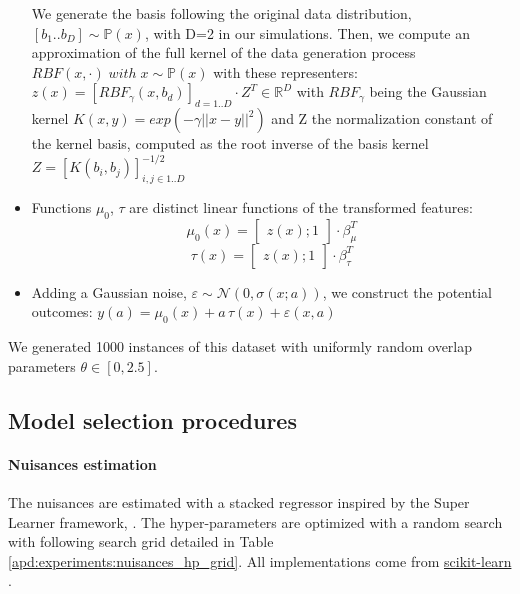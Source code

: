 \documentclass{report}
\begin{document}
\begin{appendices}
\begin{itemize}
          We generate the basis following the original data distribution, $\left [
              b_1 .. b_D \right ] \sim \mathbb P(x)$, with D=2 in our simulations. Then, we
          compute an approximation of the full kernel of the data generation
          process $RBF(x, \cdot) \;  with \; x \sim \mathbb P(x)$ with these
          representers: $z(x) = [RBF_{\gamma}(x, b_d)]_{d=1..D}
            \cdot Z^T \in \mathbb{R}^D$
          with $RBF_{\gamma}$ being the Gaussian kernel $K(x, y) = exp(-\gamma
            ||x-y||^2)$ and Z the normalization constant of the kernel basis,
          computed as the root inverse of the basis kernel $Z=[K(b_i, b_j)]_{i, j
            \in {1..D}}^{-1/2}$


    \item Functions $\mu_0$, $\tau$ are distinct linear functions of the
          transformed features:
          \begin{equation*}
            \mu_0(x) = \begin{bmatrix} z(x); 1 \end{bmatrix} \cdot \beta_{\mu}^T
          \end{equation*}
          \begin{equation*}
            \tau(x) = \begin{bmatrix} z(x); 1 \end{bmatrix} \cdot \beta_{\tau}^T
          \end{equation*}
    \item Adding a Gaussian noise, $\varepsilon \sim \mathcal N(0, \sigma(x;a))$,
          we construct the potential outcomes:
          $y(a) = \mu_0(x) + a\,\tau(x) + \varepsilon(x, a)$
  \end{itemize}
  We generated 1000 instances of this dataset with uniformly random overlap
  parameters $\theta \in \left[ 0, 2.5 \right]$.

  \subsection{Model selection procedures}

  \paragraph{Nuisances estimation}\label{apd:experiments:nuisances_hp}

  The nuisances are estimated with a stacked regressor inspired by the Super
  Learner framework, \citep{laan_super_2007}. The hyper-parameters are
  optimized with a random search with following search grid detailed in Table
  \ref{apd:experiments:nuisances_hp_grid}. All implementations come from
  \href{https://scikit-learn.org/stable/}{scikit-learn}
  \citep{pedregosa_scikitlearn_2011}.


\end{appendices}
\end{document}
